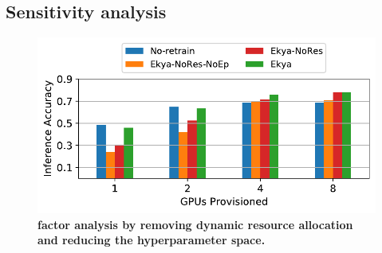 


\subsection{Sensitivity analysis}
\label{subsec:sensitivity-eval}


\begin{figure} [t!]
 	\includegraphics[width=\linewidth]{results/ablation_cityscapes_golden.pdf}
	\caption{\bf {\name} factor analysis by removing  dynamic resource allocation and reducing the hyperparameter space.}
	\label{fig:factor-analysis}
\end{figure}

